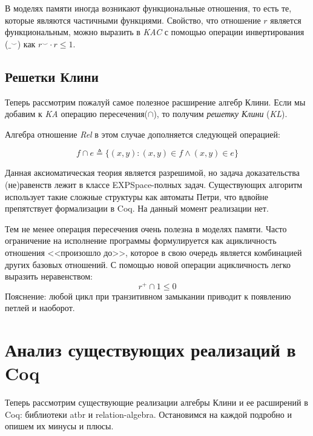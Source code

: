 \documentclass[times
              ]{itmo-student-thesis}
\begin{document}
      В моделях памяти иногда возникают функциональные отношения, то есть те, которые являются
      частичными функциями. Свойство, что отношение $ r $ является функциональным, можно выразить в
      \textit{KAC} с помощью операции инвертирования ($ \_^{\smile} $) как $ r^{\smile} \cdot r \leq 1 $.


    \subsection{Решетки Клини}
      Теперь рассмотрим пожалуй самое полезное расширение алгебр Клини.
      Если мы добавим к \textit{KA} операцию пересечения($\cap$), то получим \textit{решетку Клини} (\textit{KL}).

      Алгебра отношение \textit{Rel} в этом случае дополняется следующей операцией:

      $$ f \cap e \triangleq \{ (x, y) \colon (x, y) \in f \wedge (x, y) \in e \} $$

      Данная аксиоматическая теория является разрешимой, но задача доказательства (не)равенств лежит в
      классе EXPSpace-полных задач\cite{AlgebrasOfRelation}. Существующих алгоритм использует такие
      сложные структуры как автоматы Петри, что вдвойне препятствует формализации в Coq. На данный
      момент реализации нет.

      Тем не менее операция пересечения очень полезна в моделях памяти.
      Часто ограничение на исполнение программы формулируется как ацикличность отношения <<произошло
      до>>, которое в свою очередь является комбинацией других базовых отношений\cite{rc11}. С помощью
      новой операции ацикличность легко выразить неравенством:
      $$ r^+ \cap 1 \leq 0 $$
      Пояснение: любой цикл при транзитивном замыкании приводит к появлению петлей и наоборот.

  \section{Анализ существующих реализаций в Coq}

    Теперь рассмотрим существующие реализации алгебры Клини и ее расширений в Coq: библиотеки
    atbr\cite{atbr} и relation-algebra\cite{kat}.
    Остановимся на каждой подробно и опишем их минусы и плюсы.
\end{document}
